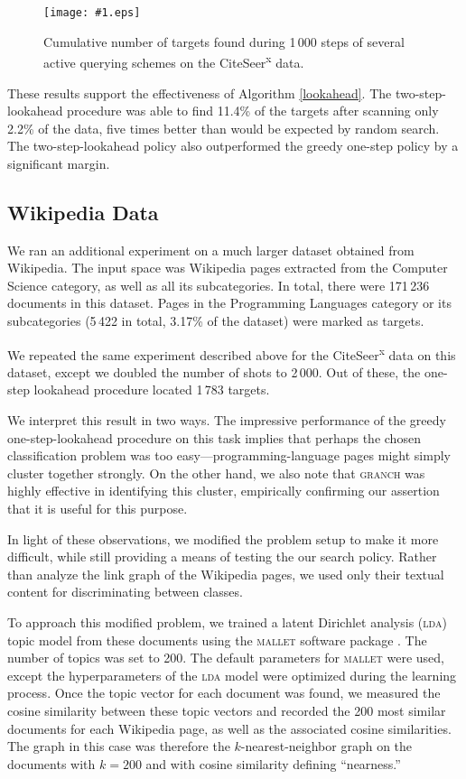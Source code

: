 \documentclass{acm_proc_article-sp}
\newcommand{\psff}[1]{\texttt{[image: \#1.eps]}}
\begin{document}
\begin{figure}
  \centering
  \psff{fig}
  \caption{Cumulative number of targets found during 1\,000 steps of
    several active querying schemes on the CiteSeer\textsuperscript{x}
    data.
  }
  \label{citeseerresults}
\end{figure}

These results support the effectiveness of Algorithm \ref{lookahead}.
The two-step-lookahead procedure was able to find 11.4\% of the
targets after scanning only 2.2\% of the data, five times better than
would be expected by random search.  The two-step-lookahead policy
also outperformed the greedy one-step policy by a significant margin.

\subsection{Wikipedia Data}

We ran an additional experiment on a much larger dataset obtained from
Wikipedia.  The input space was Wikipedia pages extracted from the
Computer Science category, as well as all its subcategories.  In
total, there were 171\,236 documents in this dataset.  Pages in the
Programming Languages category or its subcategories (5\,422 in total,
3.17\% of the dataset) were marked as targets.

We repeated the same experiment described above for the
CiteSeer\textsuperscript{x} data on this dataset, except we doubled
the number of shots to 2\,000.  Out of these, the one-step lookahead
procedure located 1\,783 targets.

We interpret this result in two ways.  The impressive performance of
the greedy one-step-lookahead procedure on this task implies that
perhaps the chosen classification problem was too
easy---programming-language pages might simply cluster together
strongly.  On the other hand, we also note that \textsc{granch} was
highly effective in identifying this cluster, empirically confirming
our assertion that it is useful for this purpose.

In light of these observations, we modified the problem setup to make
it more difficult, while still providing a means of testing the our
search policy.  Rather than analyze the link graph of the Wikipedia
pages, we used only their textual content for discriminating between
classes.

To approach this modified problem, we trained a latent Dirichlet
analysis (\textsc{lda}) topic model from these documents using the
\textsc{mallet} software package \citep{mallet}. The number of topics
was set to 200.  The default parameters for \textsc{mallet} were used,
except the hyperparameters of the \textsc{lda} model were optimized
during the learning process.  Once the topic vector for each document
was found, we measured the cosine similarity between these topic
vectors and recorded the 200 most similar documents for each Wikipedia
page, as well as the associated cosine similarities.  The graph in
this case was therefore the $k$-nearest-neighbor graph on the
documents with $k = 200$ and with cosine similarity defining
``nearness.''
\end{document}
